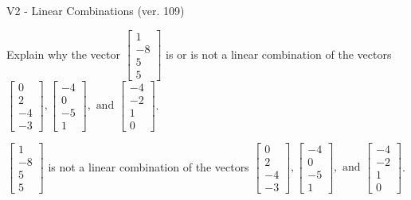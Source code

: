 \begin{exercise}
  \begin{exerciseTitle}V2 - Linear Combinations (ver. 109)\end{exerciseTitle}
  \begin{exerciseStatement}
    Explain why the vector \(\left[\begin{array}{c}
1 \\
-8 \\
5 \\
5
\end{array}\right]\)  is or is not a linear 
	combination of the vectors \(\left[\begin{array}{c}
0 \\
2 \\
-4 \\
-3
\end{array}\right] , \left[\begin{array}{c}
-4 \\
0 \\
-5 \\
1
\end{array}\right] , \text{ and } \left[\begin{array}{c}
-4 \\
-2 \\
1 \\
0
\end{array}\right]\).
	


  \end{exerciseStatement}
  \begin{exerciseAnswer}
   \(\left[\begin{array}{c}
1 \\
-8 \\
5 \\
5
\end{array}\right]\) 
  	 is not  
	a linear combination of the vectors \(\left[\begin{array}{c}
0 \\
2 \\
-4 \\
-3
\end{array}\right] , \left[\begin{array}{c}
-4 \\
0 \\
-5 \\
1
\end{array}\right] , \text{ and } \left[\begin{array}{c}
-4 \\
-2 \\
1 \\
0
\end{array}\right]\).

	
  


  \end{exerciseAnswer}
\end{exercise}